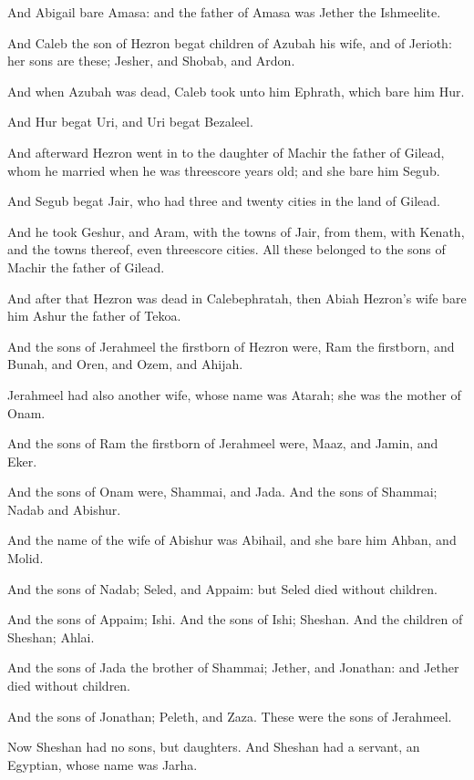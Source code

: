 \verse And Abigail bare Amasa: and the father of Amasa was Jether the Ishmeelite.

\verse And Caleb the son of Hezron begat children of Azubah his wife, and of Jerioth: her sons are these; Jesher, and Shobab, and Ardon.

\verse And when Azubah was dead, Caleb took unto him Ephrath, which bare him Hur.

\verse And Hur begat Uri, and Uri begat Bezaleel.

\verse And afterward Hezron went in to the daughter of Machir the father of Gilead, whom he married when he was threescore years old; and she bare him Segub.

\verse And Segub begat Jair, who had three and twenty cities in the land of Gilead.

\verse And he took Geshur, and Aram, with the towns of Jair, from them, with Kenath, and the towns thereof, even threescore cities. All these belonged to the sons of Machir the father of Gilead.

\verse And after that Hezron was dead in Calebephratah, then Abiah Hezron's wife bare him Ashur the father of Tekoa.

\verse And the sons of Jerahmeel the firstborn of Hezron were, Ram the firstborn, and Bunah, and Oren, and Ozem, and Ahijah.

\verse Jerahmeel had also another wife, whose name was Atarah; she was the mother of Onam.

\verse And the sons of Ram the firstborn of Jerahmeel were, Maaz, and Jamin, and Eker.

\verse And the sons of Onam were, Shammai, and Jada. And the sons of Shammai; Nadab and Abishur.

\verse And the name of the wife of Abishur was Abihail, and she bare him Ahban, and Molid.

\verse And the sons of Nadab; Seled, and Appaim: but Seled died without children.

\verse And the sons of Appaim; Ishi. And the sons of Ishi; Sheshan. And the children of Sheshan; Ahlai.

\verse And the sons of Jada the brother of Shammai; Jether, and Jonathan: and Jether died without children.

\verse And the sons of Jonathan; Peleth, and Zaza. These were the sons of Jerahmeel.

\verse Now Sheshan had no sons, but daughters. And Sheshan had a servant, an Egyptian, whose name was Jarha.

